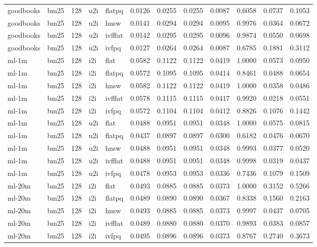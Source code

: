 \begin{tabular}{llrllrrrrrrr}
goodbooks & bm25 & 128 & u2i & flatpq & 0.0126 & 0.0255 & 0.0255 & 0.0087 & 0.6058 & 0.0737 & 0.1053 \\
goodbooks & bm25 & 128 & u2i & hnsw & 0.0141 & 0.0294 & 0.0294 & 0.0095 & 0.9976 & 0.0364 & 0.0672 \\
goodbooks & bm25 & 128 & u2i & ivfflat & 0.0142 & 0.0295 & 0.0295 & 0.0096 & 0.9874 & 0.0550 & 0.0698 \\
goodbooks & bm25 & 128 & u2i & ivfpq & 0.0127 & 0.0264 & 0.0264 & 0.0087 & 0.6785 & 0.1881 & 0.3112 \\
ml-1m & bm25 & 128 & i2i & flat & 0.0582 & 0.1122 & 0.1122 & 0.0419 & 1.0000 & 0.0573 & 0.0950 \\
ml-1m & bm25 & 128 & i2i & flatpq & 0.0572 & 0.1095 & 0.1095 & 0.0414 & 0.8461 & 0.0488 & 0.0654 \\
ml-1m & bm25 & 128 & i2i & hnsw & 0.0582 & 0.1122 & 0.1122 & 0.0419 & 1.0000 & 0.0358 & 0.0486 \\
ml-1m & bm25 & 128 & i2i & ivfflat & 0.0578 & 0.1115 & 0.1115 & 0.0417 & 0.9920 & 0.0218 & 0.0551 \\
ml-1m & bm25 & 128 & i2i & ivfpq & 0.0572 & 0.1104 & 0.1104 & 0.0412 & 0.8826 & 0.1076 & 0.1442 \\
ml-1m & bm25 & 128 & u2i & flat & 0.0488 & 0.0951 & 0.0951 & 0.0348 & 1.0000 & 0.0575 & 0.0815 \\
ml-1m & bm25 & 128 & u2i & flatpq & 0.0437 & 0.0897 & 0.0897 & 0.0300 & 0.6182 & 0.0476 & 0.0670 \\
ml-1m & bm25 & 128 & u2i & hnsw & 0.0488 & 0.0951 & 0.0951 & 0.0348 & 0.9993 & 0.0377 & 0.0520 \\
ml-1m & bm25 & 128 & u2i & ivfflat & 0.0488 & 0.0951 & 0.0951 & 0.0348 & 0.9998 & 0.0319 & 0.0437 \\
ml-1m & bm25 & 128 & u2i & ivfpq & 0.0478 & 0.0953 & 0.0953 & 0.0336 & 0.7436 & 0.1079 & 0.1509 \\
ml-20m & bm25 & 128 & i2i & flat & 0.0493 & 0.0885 & 0.0885 & 0.0373 & 1.0000 & 0.3152 & 0.5266 \\
ml-20m & bm25 & 128 & i2i & flatpq & 0.0489 & 0.0890 & 0.0890 & 0.0367 & 0.8338 & 0.1560 & 0.2163 \\
ml-20m & bm25 & 128 & i2i & hnsw & 0.0493 & 0.0885 & 0.0885 & 0.0373 & 0.9997 & 0.0437 & 0.0705 \\
ml-20m & bm25 & 128 & i2i & ivfflat & 0.0489 & 0.0880 & 0.0880 & 0.0370 & 0.9893 & 0.0383 & 0.0857 \\
ml-20m & bm25 & 128 & i2i & ivfpq & 0.0495 & 0.0896 & 0.0896 & 0.0373 & 0.8767 & 0.2740 & 0.3673 \\

\end{tabular}
